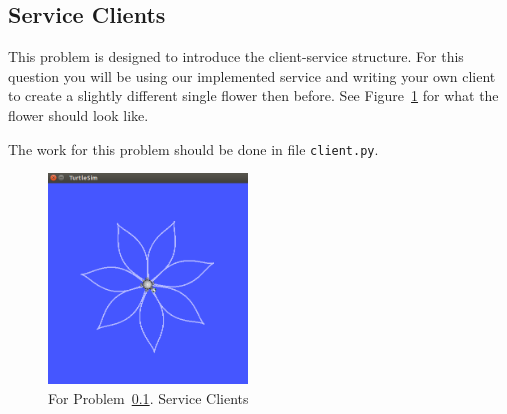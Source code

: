 \subsection{Service Clients}\label{p:client}

This problem is designed to introduce the client-service structure. For this question you will be
using our implemented service and writing your own client to create a slightly different single
flower then before. See Figure~\ref{fig:2} for what the flower should look like.

The work for this problem should be done in file \texttt{client.py}.

\begin{figure}[h]
  \centering
  \includegraphics[width=150pt]{figures/p1/problem3.png}
  \caption{For Problem~\ref{p:client}. Service Clients}
  \label{fig:2}
\end{figure}

